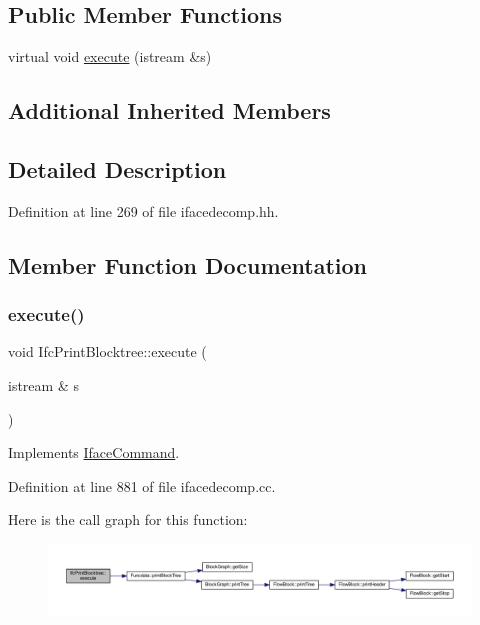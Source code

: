 \subsection*{Public Member Functions}
\begin{DoxyCompactItemize}
\item 
virtual void \mbox{\hyperlink{class_ifc_print_blocktree_a91ae7617239d47cfb294ea84c499e579}{execute}} (istream \&s)
\end{DoxyCompactItemize}
\subsection*{Additional Inherited Members}


\subsection{Detailed Description}


Definition at line 269 of file ifacedecomp.\+hh.



\subsection{Member Function Documentation}
\mbox{\label{class_ifc_print_blocktree_a91ae7617239d47cfb294ea84c499e579}} 
\subsubsection{\texorpdfstring{execute()}{execute()}}
{\footnotesize\ttfamily void Ifc\+Print\+Blocktree\+::execute (\begin{DoxyParamCaption}\item[{istream \&}]{s }\end{DoxyParamCaption})\hspace{0.3cm}{\ttfamily [virtual]}}



Implements \mbox{\hyperlink{class_iface_command_af10e29cee2c8e419de6efe9e680ad201}{Iface\+Command}}.



Definition at line 881 of file ifacedecomp.\+cc.

Here is the call graph for this function\+:
\nopagebreak
\begin{figure}[H]
\begin{center}
\leavevmode
\includegraphics[width=350pt]{class_ifc_print_blocktree_a91ae7617239d47cfb294ea84c499e579_cgraph}
\end{center}
\end{figure}


